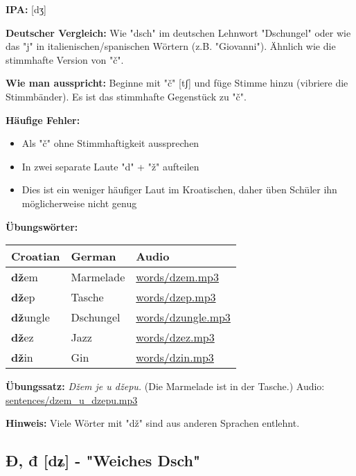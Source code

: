 \begin{tcolorbox}[breakable, colback=lightblue!30, colframe=croatianblue, title=\textbf{Dž, dž}]

\textbf{IPA:} [dʒ]

\textbf{Deutscher Vergleich:}
Wie "dsch" im deutschen Lehnwort "Dschungel" oder wie das "j" in italienischen/spanischen Wörtern (z.B. "Giovanni"). Ähnlich wie die stimmhafte Version von "č".

\textbf{Wie man ausspricht:}
Beginne mit "č" [tʃ] und füge Stimme hinzu (vibriere die Stimmbänder). Es ist das stimmhafte Gegenstück zu "č".

\textbf{Häufige Fehler:}
\begin{itemize}
    \item Als "č" ohne Stimmhaftigkeit aussprechen
    \item In zwei separate Laute "d" + "ž" aufteilen
    \item Dies ist ein weniger häufiger Laut im Kroatischen, daher üben Schüler ihn möglicherweise nicht genug
\end{itemize}

\textbf{Übungswörter:}
\begin{center}
\small
\begin{tabular}{lll}
\textbf{Croatian} & \textbf{German} & \textbf{Audio} \\
\midrule
\textbf{dž}em & Marmelade & \small\url{words/dzem.mp3} \\
\textbf{dž}ep & Tasche & \small\url{words/dzep.mp3} \\
\textbf{dž}ungle & Dschungel & \small\url{words/dzungle.mp3} \\
\textbf{dž}ez & Jazz & \small\url{words/dzez.mp3} \\
\textbf{dž}in & Gin & \small\url{words/dzin.mp3} \\
\end{tabular}
\end{center}

\textbf{Übungssatz:}
\textit{Džem je u džepu.}
(Die Marmelade ist in der Tasche.)
Audio: \small\url{sentences/dzem\_u\_dzepu.mp3}

\textbf{Hinweis:}
Viele Wörter mit "dž" sind aus anderen Sprachen entlehnt.

\end{tcolorbox}

\subsection{Đ, đ [dʑ] - "Weiches Dsch"}


